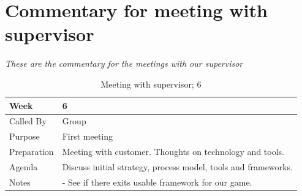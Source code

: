 
\chapter{Commentary for meeting with supervisor}
\label{appendix:F}
%
\emph{These are the commentary for the meetings with our supervisor}
%
%



{\footnotesize
\begin{table}[H]
\begin{tabular}{| p{5cm} | p{10cm} |}\hline
	\textbf{Week}	& \textbf{6} \\ \hline
	Called	By		& Group\\ \hline
	Purpose		& First meeting\\ \hline
	Preparation 
		& Meeting with customer. Thoughts on technology and tools.\\ 
		
	Agenda
		& Discuss initial strategy, process model, tools and frameworks. \\

	Notes	& - See if there exits usable framework for our game. \\ \hline
	
\end{tabular}


\caption{Meeting with supervisor; 6}
\label{fig:s_meeting_6}
\end{table}}

